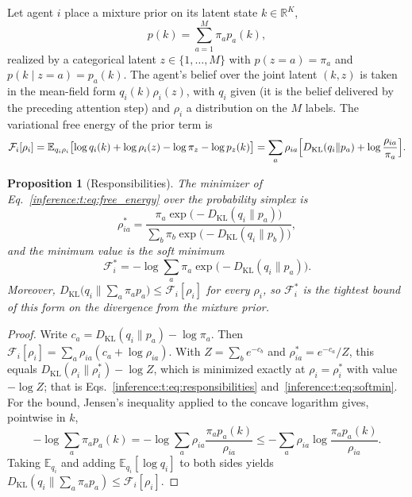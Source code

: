 \documentclass[11pt]{article}
\newtheorem{proposition}[theorem]{Proposition}
\theoremstyle{definition}
\theoremstyle{remark}
\providecommand{\KL}{D_{\mathrm{KL}}}
\providecommand{\E}{\mathbb{E}}
\providecommand{\F}{\mathcal{F}}
\begin{document}
Let agent $i$ place a mixture prior on its latent state $k\in\mathbb{R}^K$,
\begin{equation}
p(k)=\sum_{a=1}^M\pi_a p_a(k),
\label{inference:t:eq:mixture_prior}
\end{equation}
realized by a categorical latent $z\in\{1,\dots,M\}$ with $p(z=a)=\pi_a$ and $p(k\mid z=a)=p_a(k)$. The agent's belief over the joint latent $(k,z)$ is taken in the mean-field form $q_i(k)\rho_i(z)$, with $q_i$ given (it is the belief delivered by the preceding attention step) and $\rho_i$ a distribution on the $M$ labels. The variational free energy of the prior term is
\begin{equation}
\F_i[\rho_i]
=\E_{q_i\rho_i}\bigl[\log q_i(k)+\log\rho_i(z)-\log\pi_z-\log p_z(k)\bigr]
=\sum_a\rho_{ia}\Bigl[\KL(q_i\|p_a)+\log\frac{\rho_{ia}}{\pi_a}\Bigr].
\label{inference:t:eq:free_energy}
\end{equation}

\begin{proposition}[Responsibilities]
\label{inference:t:prop:responsibilities}
The minimizer of Eq.~\eqref{inference:t:eq:free_energy} over the probability simplex is
\begin{equation}
\rho_{ia}^{*}=\frac{\pi_a\exp\bigl(-\KL(q_i\|p_a)\bigr)}{\sum_b\pi_b\exp\bigl(-\KL(q_i\|p_b)\bigr)},
\label{inference:t:eq:responsibilities}
\end{equation}
and the minimum value is the soft minimum
\begin{equation}
\F_i^{*}=-\log\sum_a\pi_a\exp\bigl(-\KL(q_i\|p_a)\bigr).
\label{inference:t:eq:softmin}
\end{equation}
Moreover, $\KL\bigl(q_i\|\sum_a\pi_ap_a\bigr)\le\F_i[\rho_i]$ for every $\rho_i$, so $\F_i^{*}$ is the tightest bound of this form on the divergence from the mixture prior.
\end{proposition}

\begin{proof}
Write $c_a=\KL(q_i\|p_a)-\log\pi_a$. Then $\F_i[\rho_i]=\sum_a\rho_{ia}(c_a+\log\rho_{ia})$. With $Z=\sum_be^{-c_b}$ and $\rho^{*}_{ia}=e^{-c_a}/Z$, this equals $\KL(\rho_i\|\rho_i^{*})-\log Z$, which is minimized exactly at $\rho_i=\rho_i^{*}$ with value $-\log Z$; that is Eqs.~\eqref{inference:t:eq:responsibilities} and~\eqref{inference:t:eq:softmin}. For the bound, Jensen's inequality applied to the concave logarithm gives, pointwise in $k$,
\begin{equation*}
-\log\sum_a\pi_ap_a(k)=-\log\sum_a\rho_{ia}\frac{\pi_ap_a(k)}{\rho_{ia}}
\le-\sum_a\rho_{ia}\log\frac{\pi_ap_a(k)}{\rho_{ia}}.
\end{equation*}
Taking $\E_{q_i}$ and adding $\E_{q_i}[\log q_i]$ to both sides yields $\KL(q_i\|\sum_a\pi_ap_a)\le\F_i[\rho_i]$.
\end{proof}
\end{document}
